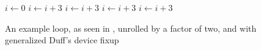 \begin{figure}[H]
	\begin{algorithmic}
		\State $i \gets 0$
			\State {}
			\State $i \gets i + 3$
			\State {}
			\State $i \gets i + 3$
		\EndWhile
				\State {}
				\State $i \gets i + 3$
			\EndCase
				\State {}
				\State $i \gets i + 3$
			\EndCase
		\EndSwitch
	\end{algorithmic}
	\caption{An example loop, as seen in , unrolled by a factor of two, and with generalized Duff's device fixup}\label{fig:impl:fixup:duff:fixup-firm-comp}
\end{figure}
